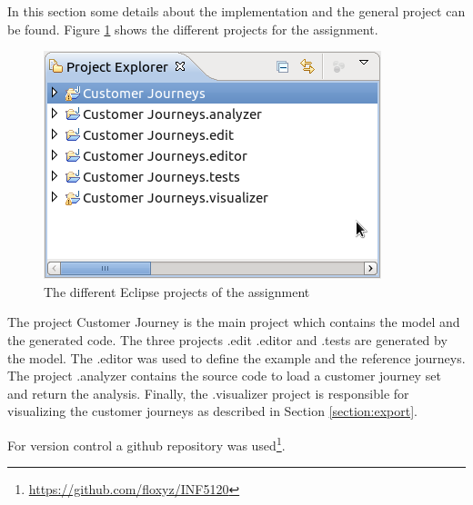 \documentclass[12pt]{scrartcl}
\begin{document}
In this section some details about the implementation and the general project can be found. Figure 
\ref{figure:projects} shows the different projects for the assignment.

\begin{figure}[hbtp]
	\centering
	\includegraphics[scale=0.5]{img/projectexplorer.png}
	\caption{The different Eclipse projects of the assignment}
	\label{figure:projects}
\end{figure}

The project Customer Journey is the main project which contains the model and the generated code. The three
projects .edit .editor and .tests are generated by the model. The .editor was used to define the example and
the reference journeys. The project .analyzer contains the source code to load a customer journey set and
return the analysis. Finally, the .visualizer project is responsible for visualizing the customer journeys as 
described in Section \ref{section:export}.

For version control a github repository was used\footnote{\url{https://github.com/floxyz/INF5120}}.
\end{document}
